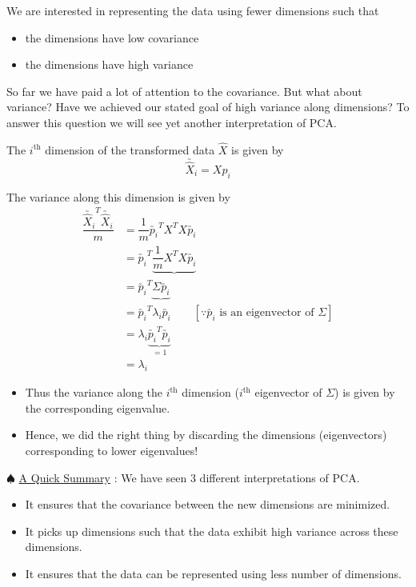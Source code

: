 \documentclass[11pt, a4paper]{article}
\begin{document}
We are interested in representing the data using fewer dimensions such that
\begin{itemize}
\item the dimensions have low covariance
\item the dimensions have high variance
\end{itemize}

So far we have paid a lot of attention to the covariance. But what about variance? Have we achieved our stated goal of high variance along dimensions? To answer this question we will see yet another interpretation of PCA. \\

\vspace{0.3cm}

The \( i^{\text{th}} \) dimension of the transformed data \( \hat{X} \) is given by
\[
\utilde{\hat{X}_i} = Xp_i
\]

The variance along this dimension is given by
\begin{align*}
\dfrac{\utilde{\hat{X}_i}^T \utilde{\hat{X}_i}}{m} &= \dfrac{1}{m} \utilde{p_i}^T X^T X \utilde{p_i} \\
&= \utilde{p_i}^T \underbrace{\dfrac{1}{m} X^T X \utilde{p_i}} \\
&= \utilde{p_i}^T \underbrace{\Sigma \utilde{p_i}} \\
&= \utilde{p_i}^T \lambda_i \utilde{p_i} \qquad [\because \utilde{p_i} \text{ is an eigenvector of } \Sigma]  \\
&= \lambda_i \underbrace{\utilde{p_i}^T \utilde{p_i}}_{=1} \\
&= \lambda_i
\end{align*}

\begin{itemize}
    \item Thus the variance along the \( i^{\text{th}} \) dimension (\( i^{\text{th}} \) eigenvector of \( \Sigma \)) is given by the corresponding eigenvalue.
    \item Hence, we did the right thing by discarding the dimensions (eigenvectors) corresponding to lower eigenvalues!
\end{itemize}

$\spadesuit$ \underline{A Quick Summary} : We have seen 3 different interpretations of PCA.
\begin{itemize}
\item It ensures that the covariance between the new dimensions are minimized.
\item It picks up dimensions such that the data exhibit high variance across these dimensions.
\item It ensures that the data can be represented using less number of dimensions.
\end{itemize}
\end{document}
